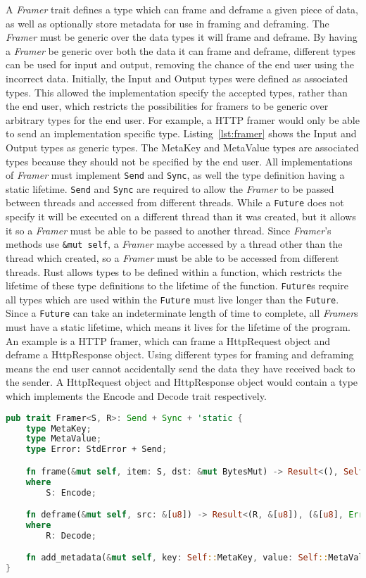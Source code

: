 A \emph{Framer} trait defines a type which can frame and deframe a given piece of data, as well as optionally store
metadata for use in framing and deframing.
The \emph{Framer} must be generic over the data types it will frame and deframe.
By having a \emph{Framer} be generic over both the data it can frame and deframe, different types can be used for input
and output, removing the chance of the end user using the incorrect data.
Initially, the Input and Output types were defined as associated types.
This allowed the implementation specify the accepted types, rather than the end user, which restricts the possibilities
for framers to be generic over arbitrary types for the end user.
For example, a HTTP framer would only be able to send an implementation specific type.
Listing~\ref{lst:framer} shows the Input and Output types as generic types.
The MetaKey and MetaValue types are associated types because they should not be specified by the end user.
All implementations of \emph{Framer} must implement \texttt{Send} and \texttt{Sync}, as well the type definition having
a static lifetime.
\texttt{Send} and \texttt{Sync} are required to allow the \emph{Framer} to be passed between threads and accessed from
different threads.
While a \texttt{Future} does not specify it will be executed on a different thread than it was created, but it allows
it so a \emph{Framer} must be able to be passed to another thread.
Since \emph{Framer}'s methods use \texttt{&mut self}, a \emph{Framer} maybe accessed by a thread other than the thread
which created, so a \emph{Framer} must be able to be accessed from different threads.
Rust allows types to be defined within a function, which restricts the lifetime of these type definitions to the
lifetime of the function.
\texttt{Future}s require all types which are used within the \texttt{Future} must live longer than the \texttt{Future}.
Since a \texttt{Future} can take an indeterminate length of time to complete, all \emph{Framer}s must have a static
lifetime, which means it lives for the lifetime of the program.
An example is a HTTP framer, which can frame a HttpRequest object and deframe a HttpResponse object.
Using different types for framing and deframing means the end user cannot accidentally send the data they have received
back to the sender.
A HttpRequest object and HttpResponse object would contain a type which implements the Encode and Decode trait
respectively.

\begin{lstlisting}[language=Rust, float=h, label=lst:framer, caption={The Framer trait, showing the Send and 'static
    requirements for all implementers, and associated types.}]
pub trait Framer<S, R>: Send + Sync + 'static {
    type MetaKey;
    type MetaValue;
    type Error: StdError + Send;

    fn frame(&mut self, item: S, dst: &mut BytesMut) -> Result<(), Self::Error>
    where
        S: Encode;

    fn deframe(&mut self, src: &[u8]) -> Result<(R, &[u8]), (&[u8], Error<Self::Error>)>
    where
        R: Decode;

    fn add_metadata(&mut self, key: Self::MetaKey, value: Self::MetaValue);
}
\end{lstlisting}

